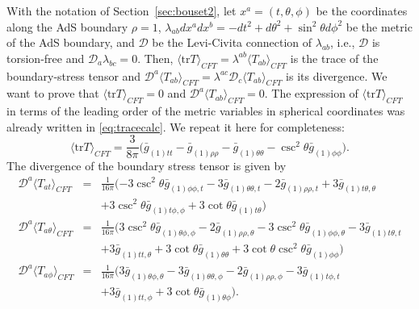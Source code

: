 \documentclass[a4paper,11pt]{article}
\numberwithin{equation}{section}
\begin{document}
With the notation of Section~\ref{sec:bouset2}, let $x^a=(t,\theta,\phi)$ be the coordinates along the AdS boundary $\rho=1$, $\lambda_{ab}dx^a dx^b=-dt^2+d\theta^2+\sin^2\theta d\phi^2$ be the metric of the AdS boundary, and $\mathcal{D}$ be the Levi-Civita connection of $\lambda_{ab}$, i.e., $\mathcal{D}$ is torsion-free and $\mathcal{D}_a\lambda_{bc}=0$. Then, $\langle \text{tr}T\rangle_{CFT}=\lambda^{ab}\langle T_{ab}\rangle_{CFT}$ is the trace of the boundary-stress tensor and $\mathcal{D}^a \langle T_{ab}\rangle_{CFT}=\lambda^{ac}\mathcal{D}_c \langle T_{ab}\rangle_{CFT}$ is its divergence. 
We want to prove that $\langle \text{tr}T\rangle_{CFT}=0$ and $\mathcal{D}^a \langle T_{ab}\rangle_{CFT}=0$. 
The expression of $\langle \text{tr}T\rangle_{CFT}$ in terms of the leading order of the metric variables in spherical coordinates was already written in \eqref{eq:tracecalc}. We repeat it here for completeness:
\begin{equation}
\label{eq:tracecalc2}
\langle \text{tr}T\rangle_{CFT}=\frac{3}{8\pi}\biggl(\bar{g}_{(1)tt}-\bar{g}_{(1)\rho\rho}-\bar{g}_{(1)\theta\theta}-\csc ^2\theta \bar{g}_{(1)\phi\phi}\biggr).
\end{equation}
The divergence of the boundary stress tensor is given by
\begin{eqnarray}
\label{eq:divergence_t}
\mathcal{D}^a \langle T_{at}\rangle_{CFT}&=&\frac{1}{16\pi}(-3 \csc ^2\theta  \bar{g}_{(1) \phi \phi ,t}-3 \bar{g}_{(1)\theta \theta ,t}-2 \bar{g}_{(1) \rho \rho ,t}+3 \bar{g}_{(1) \text{$t$$\theta $},\theta }\nonumber\\
&&+3 \csc^2\theta \bar{g}_{(1) \text{$t$$\phi $},\phi }+3 \cot \theta  \bar{g}_{(1)\text{$t$$\theta $}}) \\
\label{eq:divergence_theta}
\mathcal{D}^a \langle T_{a\theta}\rangle_{CFT}&=&\frac{1}{16\pi}(3 \csc ^2\theta  \bar{g}_{(1)\theta \phi ,\phi }-2 \bar{g}_{(1) \rho \rho ,\theta }-3 \csc
   ^2\theta \bar{g}_{(1) \phi \phi ,\theta }-3 \bar{g}_{(1) \text{$t$$\theta $},t}\nonumber\\
   &&+3
   \bar{g}_{(1) \text{$tt$},\theta }+3 \cot \theta  \bar{g}_{(1)\theta \theta }+3 \cot
   \theta \csc ^2\theta  \bar{g}_{(1) \phi \phi })\\
\label{eq:divergence_phi}
\mathcal{D}^a \langle T_{a\phi}\rangle_{CFT}&=&\frac{1}{16\pi}(3 \bar{g}_{(1)\theta \phi ,\theta }-3 \bar{g}_{(1)\theta \theta ,\phi }-2 \bar{g}_{(1) \rho
   \rho ,\phi }-3 \bar{g}_{(1) \text{$t$$\phi $},t}\nonumber\\
   &&+3 \bar{g}_{(1) \text{$tt$},\phi }+3 \cot\theta \bar{g}_{(1)\theta \phi }).
\end{eqnarray}
\end{document}
